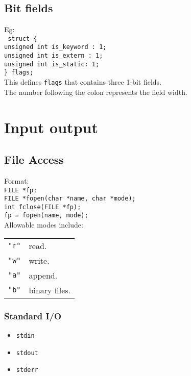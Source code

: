 \begin{multicols*}{3}
\subsection{Bit fields}

Eg:\\
\texttt{
	struct \{\\
		\qquad unsigned int is\_keyword : 1;\\
		\qquad unsigned int is\_extern : 1;\\
		\qquad unsigned int is\_static: 1;\\
	\} flags;
}\\

This defines \texttt{flags} that contains three 1-bit fields.\\
The number following the colon represents the field width.\\

\vfill \null
\columnbreak

\section{Input output}

\subsection{File Access}

Format:\\

\texttt{FILE *fp;}\\
\texttt{FILE *fopen(char *name, char *mode);}\\
\texttt{int fclose(FILE *fp);}\\
\texttt{fp = fopen(name, mode);}\\

Allowable modes include:\\
\begin{tabularx}{\linewidth}{lX}
\texttt{"r"} & read.\\
\texttt{"w"} & write.\\
\texttt{"a"} & append.\\
\texttt{"b"} & binary files.\\
\end{tabularx}

\subsubsection{Standard I/O}
\begin{itemize}
\item \texttt{stdin}
\item \texttt{stdout}
\item \texttt{stderr}
\end{itemize}


\end{multicols*}
